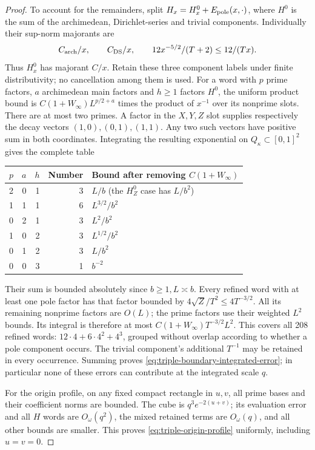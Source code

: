 \documentclass[11pt]{article}
\begin{document}
\begin{proof}
To account for the remainders, split \(H_x=H_x^0+E_{\rm pole}(x,\cdot)\),
where \(H^0\) is the sum of the archimedean, Dirichlet-series and trivial
components. Individually their sup-norm majorants are
\[
 C_{\rm arch}/x,\qquad C_{\rm DS}/x,\qquad
 12x^{-5/2}/(T+2)\leq12/(Tx).
\]
Thus \(H_x^0\) has majorant \(C/x\). Retain these three component
labels under finite distributivity; no cancellation among them is used.
For a word with \(p\) prime factors, \(a\) archimedean main factors
and \(h\geq1\) factors \(H^0\), the uniform product bound is
\(C(1+W_\infty)L^{p/2+a}\) times the product of \(x^{-1}\)
over its nonprime slots. There are at most two primes. A factor in the
\(X,Y,Z\) slot supplies respectively the decay vectors
\((1,0),(0,1),(1,1)\). Any two such vectors have positive sum in
both coordinates. Integrating the resulting exponential on
\(Q_\kappa\subset[0,1]^2\) gives the complete table
\begin{center}
\begin{tabular}{rrrrl}
\toprule
\(p\)&\(a\)&\(h\)&Number& Bound after removing \(C(1+W_\infty)\)\\
\midrule
2&0&1&3& \(L/b\) (the \(H^0_Z\) case has \(L/b^2\))\\
1&1&1&6& \(L^{3/2}/b^2\)\\
0&2&1&3& \(L^2/b^2\)\\
1&0&2&3& \(L^{1/2}/b^2\)\\
0&1&2&3& \(L/b^2\)\\
0&0&3&1& \(b^{-2}\)\\
\bottomrule
\end{tabular}
\end{center}
Their sum is bounded absolutely since \(b\geq1,L\asymp b\).
Every refined word with at least one pole factor has that factor
bounded by \(4\sqrt Z/T^2\leq4T^{-3/2}\). All its remaining
nonprime factors are \(O(L)\); the prime factors use their weighted
\(L^2\) bounds. Its integral is therefore at most
\(C(1+W_\infty)T^{-3/2}L^2\). This covers all 208 refined words:
\(12\cdot4+6\cdot4^2+4^3\), grouped without overlap according to
whether a pole component occurs. The trivial component's additional
\(T^{-1}\) may be retained in every occurrence. Summing proves
\eqref{eq:triple-boundary-integrated-error}; in particular none of these
errors can contribute at the integrated scale \(q\).

For the origin profile, on any fixed compact rectangle in \(u,v\),
all prime bases and their coefficient norms are bounded. The cube is
\(q^3e^{-2(u+v)}\); its evaluation error and all \(H\) words are
\(O_\omega(q^2)\), the mixed retained terms are \(O_\omega(q)\),
and all other bounds are smaller. This proves
\eqref{eq:triple-origin-profile} uniformly, including \(u=v=0\).


\end{proof}
\end{document}
